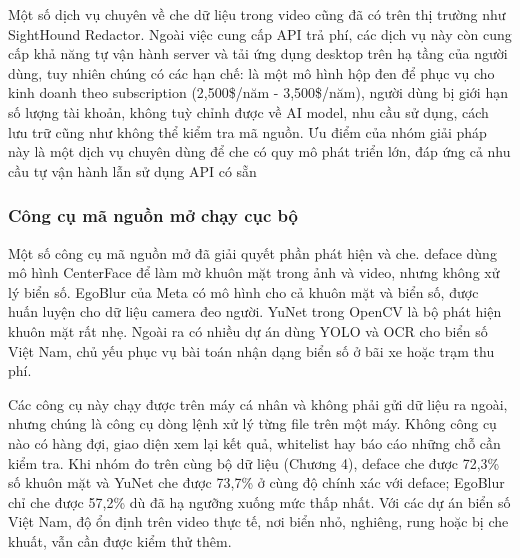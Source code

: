 \documentclass[a4paper,12pt]{article}
\begin{document}
Một số dịch vụ chuyên về che dữ liệu trong video cũng đã có trên thị trường như SightHound Redactor. Ngoài việc cung cấp API trả phí, các dịch vụ này còn cung cấp khả năng tự vận hành server và tải ứng dụng desktop trên hạ tầng của người dùng, tuy nhiên chúng có các hạn chế: là một mô hình hộp đen để phục vụ cho kinh doanh theo subscription (2,500\$/năm - 3,500\$/năm), người dùng bị giới hạn số lượng tài khoản, không tuỳ chỉnh được về AI model, nhu cầu sử dụng, cách lưu trữ cũng như không thể kiểm tra mã nguồn. Ưu điểm của nhóm giải pháp này là một dịch vụ chuyên dùng để che có quy mô phát triển lớn, đáp ứng cả nhu cầu tự vận hành lẫn sử dụng API có sẵn


\subsubsection{Công cụ mã nguồn mở chạy cục bộ}

Một số công cụ mã nguồn mở đã giải quyết phần phát hiện và che. deface dùng mô hình CenterFace để làm mờ khuôn mặt trong ảnh và video, nhưng không xử lý biển số. EgoBlur của Meta có mô hình cho cả khuôn mặt và biển số, được huấn luyện cho dữ liệu camera đeo người. YuNet trong OpenCV là bộ phát hiện khuôn mặt rất nhẹ. Ngoài ra có nhiều dự án dùng YOLO và OCR cho biển số Việt Nam, chủ yếu phục vụ bài toán nhận dạng biển số ở bãi xe hoặc trạm thu phí.

Các công cụ này chạy được trên máy cá nhân và không phải gửi dữ liệu ra ngoài, nhưng chúng là công cụ dòng lệnh xử lý từng file trên một máy. Không công cụ nào có hàng đợi, giao diện xem lại kết quả, whitelist hay báo cáo những chỗ cần kiểm tra. Khi nhóm đo trên cùng bộ dữ liệu (Chương 4), deface che được 72,3\% số khuôn mặt và YuNet che được 73,7\% ở cùng độ chính xác với deface; EgoBlur chỉ che được 57,2\% dù đã hạ ngưỡng xuống mức thấp nhất. Với các dự án biển số Việt Nam, độ ổn định trên video thực tế, nơi biển nhỏ, nghiêng, rung hoặc bị che khuất, vẫn cần được kiểm thử thêm.
\end{document}
